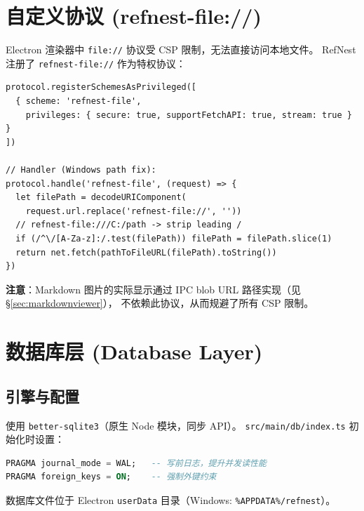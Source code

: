 \documentclass[12pt, a4paper]{article}
\begin{document}
\section{自定义协议 (refnest-file://)}
\label{sec:protocol}

Electron 渲染器中 \texttt{file://} 协议受 CSP 限制，无法直接访问本地文件。
RefNest 注册了 \texttt{refnest-file://} 作为特权协议：

\begin{lstlisting}[language={}]
protocol.registerSchemesAsPrivileged([
  { scheme: 'refnest-file',
    privileges: { secure: true, supportFetchAPI: true, stream: true } }
])

// Handler (Windows path fix):
protocol.handle('refnest-file', (request) => {
  let filePath = decodeURIComponent(
    request.url.replace('refnest-file://', ''))
  // refnest-file:///C:/path -> strip leading /
  if (/^\/[A-Za-z]:/.test(filePath)) filePath = filePath.slice(1)
  return net.fetch(pathToFileURL(filePath).toString())
})
\end{lstlisting}

\textbf{注意}：Markdown 图片的实际显示通过 IPC blob URL 路径实现（见 \S\ref{sec:markdownviewer}），
不依赖此协议，从而规避了所有 CSP 限制。

\section{数据库层 (Database Layer)}

\subsection{引擎与配置}

使用 \texttt{better-sqlite3}（原生 Node 模块，同步 API）。
\texttt{src/main/db/index.ts} 初始化时设置：

\begin{lstlisting}[language=SQL]
PRAGMA journal_mode = WAL;   -- 写前日志，提升并发读性能
PRAGMA foreign_keys = ON;    -- 强制外键约束
\end{lstlisting}

数据库文件位于 Electron \texttt{userData} 目录（Windows: \texttt{\%APPDATA\%/refnest}）。
\end{document}
